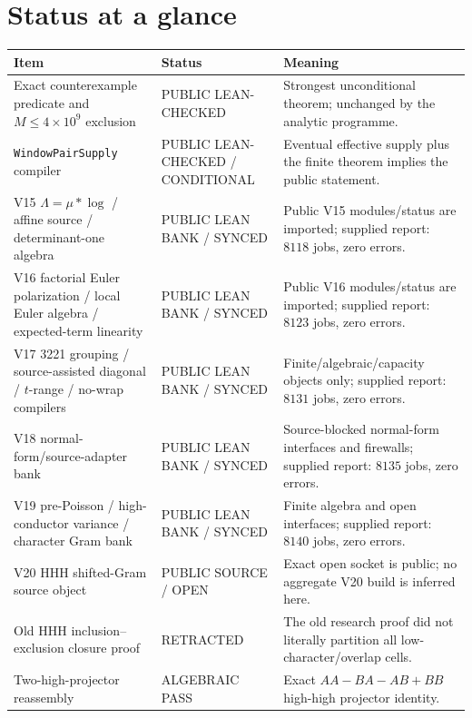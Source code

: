 \documentclass[11pt]{article}
\theoremstyle{definition}
\newcommand{\1}{\mathbf 1}
\newcommand{\status}[1]{\textsf{#1}}
\begin{document}
\section*{Status at a glance}
\begin{center}
\footnotesize
\renewcommand{\arraystretch}{1.16}
\begin{tabularx}{\textwidth}{>{\raggedright\arraybackslash}p{}
>{\raggedright\arraybackslash}p{}X}
\toprule
Item & Status & Meaning \\
\midrule
Exact counterexample predicate and $M\le4\times10^9$ exclusion &
\status{PUBLIC LEAN-CHECKED} &
Strongest unconditional theorem; unchanged by the analytic programme.\\
\texttt{WindowPairSupply} compiler &
\status{PUBLIC LEAN-CHECKED / CONDITIONAL} &
Eventual effective supply plus the finite theorem implies the public statement.\\
V15 $\Lambda=\mu*\log$ / affine source / determinant-one algebra &
\status{PUBLIC LEAN BANK / SYNCED} &
Public V15 modules/status are imported; supplied report: $8118$ jobs, zero errors.\\
V16 factorial Euler polarization / local Euler algebra / expected-term linearity &
\status{PUBLIC LEAN BANK / SYNCED} &
Public V16 modules/status are imported; supplied report: $8123$ jobs, zero errors.\\
V17 3221 grouping / source-assisted diagonal / $t$-range / no-wrap compilers &
\status{PUBLIC LEAN BANK / SYNCED} &
Finite/algebraic/capacity objects only; supplied report: $8131$ jobs, zero errors.\\
V18 normal-form/source-adapter bank &
\status{PUBLIC LEAN BANK / SYNCED} &
Source-blocked normal-form interfaces and firewalls; supplied report: $8135$ jobs, zero errors.\\
V19 pre-Poisson / high-conductor variance / character Gram bank &
\status{PUBLIC LEAN BANK / SYNCED} &
Finite algebra and open interfaces; supplied report: $8140$ jobs, zero errors.\\
V20 HHH shifted-Gram source object &
\status{PUBLIC SOURCE / OPEN} &
Exact open socket is public; no aggregate V20 build is inferred here.\\
Old HHH inclusion--exclusion closure proof &
\status{RETRACTED} &
The old research proof did not literally partition all low-character/overlap cells.\\
Two-high-projector reassembly &
\status{ALGEBRAIC PASS} &
Exact $AA-BA-AB+BB$ high-high projector identity.\\

\end{tabularx}
\end{center}
\end{document}
